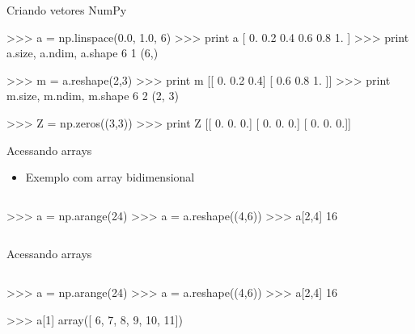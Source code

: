 \documentclass[12pt,t,graphics]{beamer}
\begin{document}

\begin{frame}[t,fragile]{Criando vetores NumPy}
\begin{python}
>>> a = np.linspace(0.0, 1.0, 6)
>>> print a
[ 0.   0.2  0.4  0.6  0.8  1. ]
>>> print a.size, a.ndim, a.shape    
6 1 (6,)
	
>>> m = a.reshape(2,3)
>>> print m
[[ 0.   0.2  0.4]
[ 0.6  0.8  1. ]]
>>> print m.size, m.ndim, m.shape
6 2 (2, 3)
	
>>> Z = np.zeros((3,3))
>>> print Z
[[ 0.  0.  0.]
[ 0.  0.  0.]
[ 0.  0.  0.]]
\end{python}
\end{frame}

\begin{frame}[t,fragile]{Acessando arrays}
	\begin{itemize}
		\item Exemplo com array bidimensional
	\end{itemize}
	\begin{columns}
		\begin{python}
>>> a = np.arange(24)
>>> a = a.reshape((4,6))
>>> a[2,4]
16
		\end{python}
		
	\end{columns}
\end{frame}

\begin{frame}[t,fragile]{Acessando arrays}
	\begin{columns}
		\column{.8\textwidth}
		\begin{python}
>>> a = np.arange(24)
>>> a = a.reshape((4,6))
>>> a[2,4]
16

>>> a[1]
array([ 6,  7,  8,  9, 10, 11])
		\end{python}
	\end{columns}
\end{frame}
\end{document}
